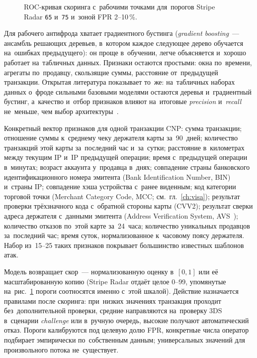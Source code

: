 \begin{figure}[htbp]
  \centering
  \caption{ROC-кривая скоринга с~рабочими точками для~порогов
  Stripe Radar \texttt{65} и~\texttt{75} и~зоной FPR 2--10\,\%.}\label{fig:fraud-hybrid}
\end{figure}

Для рабочего антифрода хватает градиентного бустинга (\textit{gradient
  boosting}~--- ансамбль решающих деревьев, в~котором каждое следующее дерево
обучается на~ошибках предыдущего): он проще в~обучении, легче объясняется
и~хорошо работает на~табличных данных. Признаки остаются простыми: окна
по~времени, агрегаты по~продавцу, скользящие суммы, расстояние от~предыдущей
транзакции. Открытая литература показывает то~же: на~табличных наборах данных
о~фроде сильными базовыми моделями остаются деревья и~градиентный бустинг,
а~качество и~отбор признаков влияют на~итоговые \textit{precision}
и~\textit{recall} не~меньше, чем выбор
архитектуры~\cite{fraud-feature-selection-2024,fraud-lightgbm-2024}.

Конкретный вектор признаков для одной транзакции CNP: сумма транзакции;
отношение суммы к~среднему чеку держателя карты за~90~дней; количество
транзакций этой карты за~последний час и~за~сутки; расстояние в~километрах
между текущим IP и~IP предыдущей операции; время с~предыдущей операции
в~минутах; возраст аккаунта у~продавца в~днях; совпадение страны банковского
идентификационного номера эмитента (Bank Identification Number, BIN) и~страны IP; совпадение хэша устройства с~ранее
виденным; код категории торговой точки (Merchant Category Code, MCC;
см.~гл.~\ref{ch:visa}); результат проверки трёхзначного кода с~обратной
стороны карты (CVV2); результат сверки адреса держателя с~данными эмитента
(Address Verification System, AVS~\cite{visa-avs-2024}); количество
отказов по~этой карте за~24~часа; количество уникальных продавцов за~последний
час; время суток, нормализованное к~часовому поясу держателя. Набор из~15--25
таких признаков покрывает большинство известных шаблонов атак.

Модель возвращает скор~--- нормализованную оценку в~$[0, 1]$ или её
масштабированную копию (Stripe Radar отдаёт целое 0--99, упомянутые
на~рис.~\ref{fig:fraud-hybrid} пороги соотносятся именно с~этой шкалой).
Действие назначается правилами после скоринга: при~низких значениях транзакция
проходит без~дополнительной проверки, средние направляются на~проверку 3DS
в~сценарии \textit{challenge} или в~ручную очередь, высокие
получают автоматический отказ. Пороги калибруются под целевую долю FPR,
конкретные числа оператор подбирает эмпирически по~собственным данным;
универсальных значений для произвольного потока не~существует.

